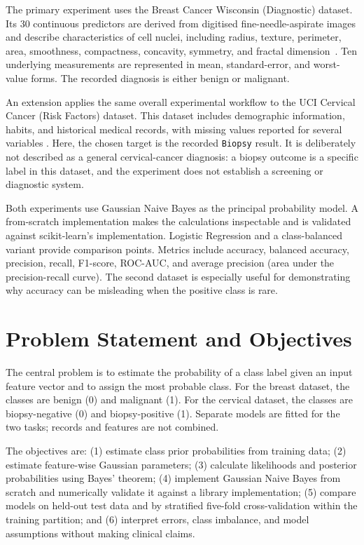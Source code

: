 \documentclass[conference]{IEEEtran}
\begin{document}
The primary experiment uses the Breast Cancer Wisconsin (Diagnostic) dataset. Its 30 continuous predictors are derived from digitised fine-needle-aspirate images and describe characteristics of cell nuclei, including radius, texture, perimeter, area, smoothness, compactness, concavity, symmetry, and fractal dimension \,\cite{uciBreast,street}. Ten underlying measurements are represented in mean, standard-error, and worst-value forms. The recorded diagnosis is either benign or malignant.

An extension applies the same overall experimental workflow to the UCI Cervical Cancer (Risk Factors) dataset. This dataset includes demographic information, habits, and historical medical records, with missing values reported for several variables \cite{uciCervical,fernandes}. Here, the chosen target is the recorded \texttt{Biopsy} result. It is deliberately not described as a general cervical-cancer diagnosis: a biopsy outcome is a specific label in this dataset, and the experiment does not establish a screening or diagnostic system.

Both experiments use Gaussian Naive Bayes as the principal probability model. A from-scratch implementation makes the calculations inspectable and is validated against scikit-learn's implementation. Logistic Regression and a class-balanced variant provide comparison points. Metrics include accuracy, balanced accuracy, precision, recall, F1-score, ROC-AUC, and average precision (area under the precision-recall curve). The second dataset is especially useful for demonstrating why accuracy can be misleading when the positive class is rare.

\section{Problem Statement and Objectives}
The central problem is to estimate the probability of a class label given an input feature vector and to assign the most probable class. For the breast dataset, the classes are benign (0) and malignant (1). For the cervical dataset, the classes are biopsy-negative (0) and biopsy-positive (1). Separate models are fitted for the two tasks; records and features are not combined.

The objectives are: (1) estimate class prior probabilities from training data; (2) estimate feature-wise Gaussian parameters; (3) calculate likelihoods and posterior probabilities using Bayes' theorem; (4) implement Gaussian Naive Bayes from scratch and numerically validate it against a library implementation; (5) compare models on held-out test data and by stratified five-fold cross-validation within the training partition; and (6) interpret errors, class imbalance, and model assumptions without making clinical claims.
\end{document}
